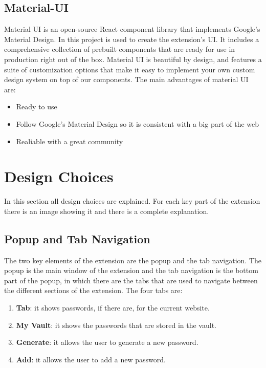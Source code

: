 \subsection {Material-UI}

Material UI is an open-source React component library that implements Google's Material Design. In this project is used to create the extension's UI.
It includes a comprehensive collection of prebuilt components that are ready for use in production right out of the box.
Material UI is beautiful by design, and features a suite of customization options that make it easy to implement your own custom design system on top of our components.
The main advantages of material UI are:

\begin{itemize}
    \item Ready to use
    \item Follow Google's Material Design so it is consistent with a big part of the web
    \item Realiable with a great community
\end{itemize}


\section {Design Choices}

In this section all design choices are explained. For each key part of the extension there is an image showing it and there is a complete explanation.

\subsection {Popup and Tab Navigation}

The two key elements of the extension are the popup and the tab navigation. The popup is the main window of the extension and the tab navigation is the bottom part of the popup, in which there are the tabs that are used to navigate between the different sections of the extension. The four tabs are:

\begin{enumerate}
    \item \textbf{Tab}: it shows passwords, if there are, for the current website.
    \item \textbf{My Vault}: it shows the passwords that are stored in the vault.
    \item \textbf{Generate}: it allows the user to generate a new password.
    \item \textbf{Add}: it allows the user to add a new password.
\end{enumerate}

